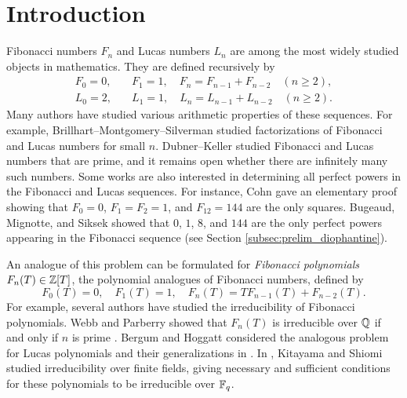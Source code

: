 \section{Introduction}
\label{sec:intro}


Fibonacci numbers $F_n$ and Lucas numbers $L_n$ are among the most widely studied objects in mathematics. They are defined recursively by
\begin{align*}
F_0 = 0, &\quad F_1 = 1,\quad F_{n} = F_{n-1} + F_{n-2} \quad(n \ge 2), \\
L_0 = 2, &\quad L_1 = 1,\quad L_{n} = L_{n-1} + L_{n-2} \quad(n \ge 2).
\end{align*}
Many authors have studied various arithmetic properties of these sequences.
For example, Brillhart--Montgomery--Silverman \cite{brillhart1988tables} studied factorizations of Fibonacci and Lucas numbers for small $n$. Dubner--Keller \cite{dubner1999new} studied Fibonacci and Lucas numbers that are prime, and it remains open whether there are infinitely many such numbers.
Some works are also interested in determining all perfect powers in the Fibonacci and Lucas sequences.
For instance, Cohn \cite{cohn1964square} gave an elementary proof showing that $F_0 = 0$, $F_1 = F_2 = 1$, and $F_{12} = 144$ are the only squares.
Bugeaud, Mignotte, and Siksek \cite{bugeaud2006classical} showed that $0$, $1$, $8$, and $144$ are the only perfect powers appearing in the Fibonacci sequence (see Section \ref{subsec:prelim_diophantine}).

An analogue of this problem can be formulated for \emph{Fibonacci polynomials} $F_n(T) \in \mathbb{Z}[T]$, the polynomial analogues of Fibonacci numbers, defined by
\begin{equation}
\label{eqn:fibo_poly}
    F_0(T) = 0, \quad F_1(T) = 1, \quad F_{n}(T) = T F_{n-1}(T) + F_{n-2}(T).
\end{equation}
For example, several authors have studied the irreducibility of Fibonacci polynomials. Webb and Parberry showed that $F_n(T)$ is irreducible over $\mathbb{Q}$ if and only if $n$ is prime \cite{webb1969divisibility}.
Bergum and Hoggatt considered the analogous problem for Lucas polynomials and their generalizations in \cite{bergum1974irreducibility}.
In \cite{kitayama2017irreducibility}, Kitayama and Shiomi studied irreducibility over finite fields, giving necessary and sufficient conditions for these polynomials to be irreducible over $\mathbb{F}_q$.

